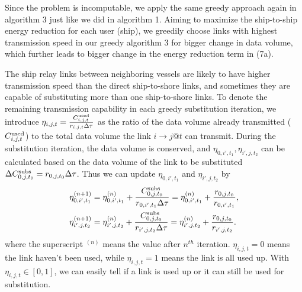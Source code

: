 \documentclass[conference]{IEEEtran}
\begin{document}
Since the problem is incomputable, we apply the same greedy approach again in algorithm 3 just like we did in algorithm 1. %
Aiming to maximize the ship-to-ship energy reduction for each user (ship), we greedily choose links with highest transmission speed in our greedy algorithm 3 for bigger change in data volume, which further leads to bigger change in the energy reduction term in (7a). 



The ship relay links between neighboring vessels are likely to have higher transmission speed than the direct ship-to-shore links, and sometimes they are capable of substituting more than one ship-to-shore links. To denote the remaining transmission capability in each greedy substitution iteration, we introduce $\eta _{i,j,t}=\frac{{C_{i,j,t}^{{\rm{used}}}}}{{{r_{i,j,t}}\Delta \tau }}$ as the ratio of the data volume already transmitted (${C_{i,j,t}^{{\rm{used}}}}$) to the total data volume the link $i \to j @ t$ can transmit. During the substitution iteration, the data volume is conserved, and $\eta _{0,i',t_1},\eta _{i',j,t_2} $ can be calculated based on the data volume of the link to be substituted $\Delta {C_{0,j,t_0}^{{\rm{subs}}}}=r_{0,j,t_0}\Delta \tau $. 
Thus we can update $\eta _{0,i',t_1}$ and $\eta _{i',j,t_2} $ by 
\begin{subequations}
  \begin{align}
    {\eta _{0,i',t_1}^{\left( {n+1} \right)}} &  = {\eta _{0,i',t_1}^{\left( n \right)}} + \frac{C_{0,j,t_0}^{{\rm{subs}}}}{{{r_{0,i',{t_1}}}\Delta \tau }} = {\eta _{0,i',t_1}^{\left( n \right)}} + \frac{{{r_{0,j,{t_0}}}}}{{{r_{0,i',{t_1}}}}},\\
    {\eta _{i',j,t_2}^{\left( {n+1} \right)}} &  = {\eta _{i',j,t_2}^{\left( n \right)}} + \frac{C_{0,j,t_0}^{{\rm{subs}}}}{{{r_{i',j,{t_2}}}\Delta \tau }} = {\eta _{i',j,t_2}^{\left( n \right)}} + \frac{{{r_{0,j,{t_0}}}}}{{{r_{i',j,{t_2}}}}}.
  \end{align}
\end{subequations} 
where the superscript $^{\left( n \right)}$ means the value after $n^{th}$ iteration. 
$\eta _{i,j,t}=0$ means the link haven't been used, while $\eta _{i,j,t}=1$ means the link is all used up. With $\eta _{i,j,t} \in \left[{0,1}\right]$, we can easily tell if a link is used up or it can still be used for substitution. 
\end{document}
